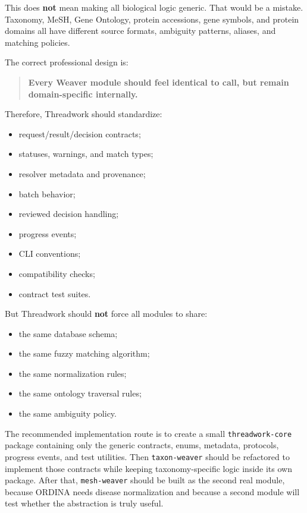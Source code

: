 \documentclass[11pt,a4paper]{article}
\newcommand{\code}[1]{\texttt{#1}}
\begin{document}
This does \textbf{not} mean making all biological logic generic. That would be a mistake. Taxonomy, MeSH, Gene Ontology, protein accessions, gene symbols, and protein domains all have different source formats, ambiguity patterns, aliases, and matching policies.

The correct professional design is:

\begin{quote}
\textbf{Every Weaver module should feel identical to call, but remain domain-specific internally.}
\end{quote}

Therefore, Threadwork should standardize:

\begin{itemize}
  \item request/result/decision contracts;
  \item statuses, warnings, and match types;
  \item resolver metadata and provenance;
  \item batch behavior;
  \item reviewed decision handling;
  \item progress events;
  \item CLI conventions;
  \item compatibility checks;
  \item contract test suites.
\end{itemize}

But Threadwork should \textbf{not} force all modules to share:

\begin{itemize}
  \item the same database schema;
  \item the same fuzzy matching algorithm;
  \item the same normalization rules;
  \item the same ontology traversal rules;
  \item the same ambiguity policy.
\end{itemize}

The recommended implementation route is to create a small \code{threadwork-core} package containing only the generic contracts, enums, metadata, protocols, progress events, and test utilities. Then \code{taxon-weaver} should be refactored to implement those contracts while keeping taxonomy-specific logic inside its own package. After that, \code{mesh-weaver} should be built as the second real module, because ORDINA needs disease normalization and because a second module will test whether the abstraction is truly useful.
\end{document}

